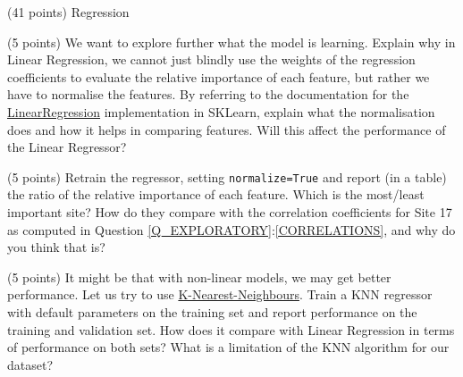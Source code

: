 \documentclass[12pt]{article}
\begin{document}
\begin{question}{\label{Q_LR_BA}(41 points) Regression}
\begin{subquestion}



\end{subquestion}



\begin{subquestion}{(5 points) We want to explore further what the model is learning. Explain why in Linear Regression, we cannot just blindly use the weights of the regression coefficients to evaluate the relative importance of each feature, but rather we have to normalise the features. By referring to the documentation for the \href{http://scikit-learn.org/stable/modules/generated/sklearn.linear_model.LinearRegression.html}{LinearRegression} implementation in SKLearn, explain what the normalisation does and how it helps in comparing features. Will this affect the performance of the Linear Regressor?}






\end{subquestion}

\begin{subquestion}{(5 points) Retrain the regressor, setting \texttt{normalize=True} and report (in a table) the ratio of the relative importance of each feature. Which is the most/least important site? How do they compare with the correlation coefficients for Site 17 as computed in Question \ref{Q_EXPLORATORY}:\ref{CORRELATIONS}, and why do you think that is?}






\end{subquestion}

\begin{subquestion}{(5 points) It might be that with non-linear models, we may get better performance. Let us try to use \href{https://scikit-learn.org/stable/modules/generated/sklearn.neighbors.KNeighborsRegressor.html}{K-Nearest-Neighbours}. Train a KNN regressor with default parameters on the training set and report performance on the training and validation set.  How does it compare with Linear Regression in terms of performance on both sets? What is a limitation of the KNN algorithm for our dataset?}




\end{subquestion}
\end{question}
\end{document}
